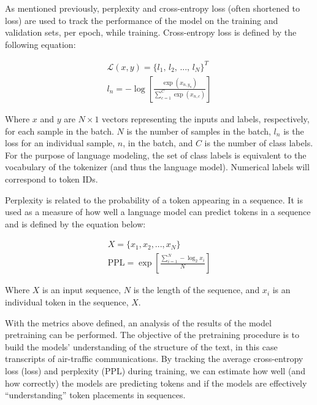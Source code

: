 \documentclass[12pt]{article}
\begin{document}
As mentioned previously, perplexity and cross-entropy loss (often shortened to loss) are used to track the performance of the model on the training
and validation sets, per epoch, while training. Cross-entropy loss is defined by the following equation:

\begin{equation}\label{eq:cross_entropy_loss}
    \begin{gathered}
        \mathcal{L}(x, y) = \{\mbox{$l_1$, $l_2$, ..., $l_N$}\}^T\\
        l_n = -\log \left[\frac{\exp(x_{n,y_n})}{\sum_{c=1}^{C}\exp(x_{n,c})}\right]
    \end{gathered}
\end{equation}

\noindent
Where $x$ and $y$ are $N \times 1$ vectors representing the inputs and labels, respectively, for each sample in the batch. $N$ is the number of
samples in the batch, $l_n$ is the loss for an individual sample, $n$, in the batch, and $C$ is the number of class labels. For the purpose of
language modeling, the set of class labels is equivalent to the vocabulary of the tokenizer (and thus the language model). Numerical labels will
correspond to token IDs.

Perplexity is related to the probability of a token appearing in a sequence. It is used as a measure of how well a language model can predict tokens
in a sequence and is defined by the equation below:

\begin{equation}\label{eq:perplexity}
    \begin{gathered}
        X = \{x_1, x_2, ..., x_N\}\\
        \mbox{PPL} = \exp\left[\frac{\sum_{i=1}^N - \log_2 x_i}{N}\right]
    \end{gathered}
\end{equation}

\noindent
Where $X$ is an input sequence, $N$ is the length of the sequence, and $x_i$ is an individual token in the sequence, $X$.

With the metrics above defined, an analysis of the results of the model pretraining can be performed. The objective of the pretraining procedure is to
build the models' understanding of the structure of the text, in this case transcripts of air-traffic communications. By tracking the average
cross-entropy loss (loss) and perplexity (PPL) during training, we can estimate how well (and how correctly) the models are predicting tokens and if
the models are effectively ``understanding'' token placements in sequences.
\end{document}
